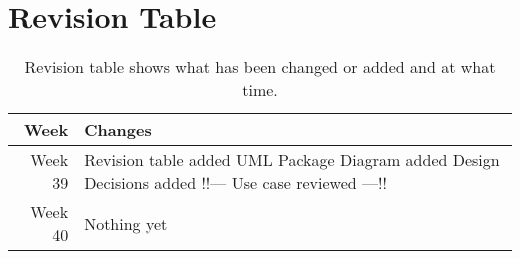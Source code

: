\section{Revision Table}
\begin{table*}[ht]\centering
  \begin{tabularx}{\textwidth}{@{}rX@{}}
    \toprule
    \textbf{Week} & \textbf{Changes} \\\hline
    Week 39 & Revision table added\newline  
    		UML Package Diagram added\newline
    		Design Decisions added\newline
    		!!--- Use case reviewed ---!!\\\hline
    Week 40 & Nothing yet\\
    \bottomrule
  \end{tabularx}
  \caption{Revision table shows what has been changed or added and at what time.}
  \label{glossary}\centering
\end{table*}
\newpage